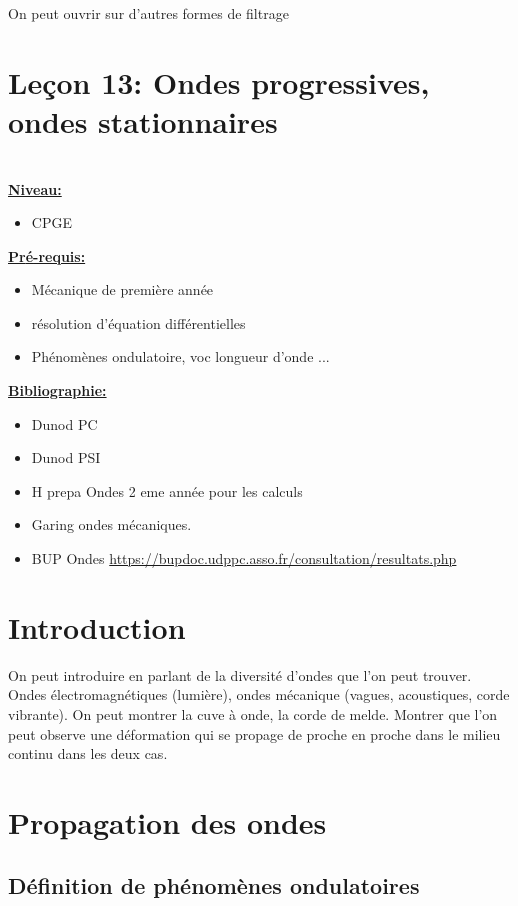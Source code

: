 \documentclass[french, a4paper, 10pt, twocolumn, landscape]{article}
\begin{document}
On peut ouvrir sur d'autres formes de filtrage

\clearpage
\section*{Leçon 13: Ondes progressives, ondes stationnaires}

\hrulefill\\

\noindent\underline{\textbf{Niveau:}}
\begin{itemize}
  \item CPGE 
\end{itemize}
\underline{\textbf{Pr{\'e}-requis: }}

\begin{itemize}  
\item Mécanique de première année
\item résolution d'équation différentielles
\item Phénomènes ondulatoire, voc longueur d'onde ...
\end{itemize}
\underline{\textbf{Bibliographie:}}

\begin{itemize}
  \item Dunod PC
  \item Dunod PSI
  \item H prepa Ondes 2 eme année pour les calculs
  \item Garing ondes mécaniques.
  \item BUP Ondes \url{https://bupdoc.udppc.asso.fr/consultation/resultats.php}
\end{itemize}
\hrulefill

\section*{Introduction}

On peut introduire en parlant de la diversité d'ondes que l'on peut trouver.
Ondes électromagnétiques (lumière), ondes mécanique (vagues, acoustiques, corde vibrante). 
On peut montrer la cuve à onde, la corde de melde. Montrer que l'on peut observe une déformation qui se propage de proche en proche dans le milieu continu dans les deux cas. 

\section*{Propagation des ondes}

\subsection*{Définition de phénomènes ondulatoires}
\end{document}
